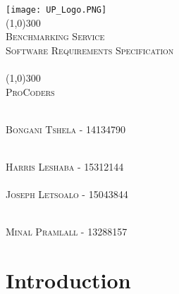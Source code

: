 \documentclass[runningheads,a4paper]{article}
\begin{document}
	
\begin{titlepage}
	\begin{center}
		\texttt{[image: UP\_Logo.PNG]}  \\
		[1cm]
		\line(1,0){300} \\
		[0.3cm]
		\textsc{\Large
			Benchmarking Service\\
			Software Requirements Specification\\
			\hfill
		}\\
		[0.1cm]
		\line(1,0){300} \\
		[0.7cm]
		\textsc{\Large
			ProCoders
		} \\
	\end{center}
	
	\begin{center}
		\begin{centre}
			\textsc{\large\\
				Bongani Tshela - 14134790\\ 
			}
		
				\textsc{\large\\
					Harris Leshaba - 15312144\\ 
				}
			\textsc{\large\\
				Joseph Letsoalo - 15043844\\ 
			}
			
			\textsc{\large\\
				Minal Pramlall - 13288157\\ 
			}
			

            

		\end{centre}
		
		
		
	\end{center}
\end{titlepage}

\begingroup

\tableofcontents
{}
\endgroup
\newpage

\section{Introduction}
\end{document}
